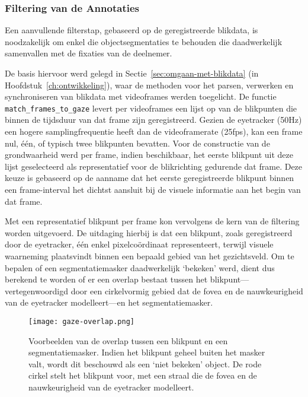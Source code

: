 \subsubsection{Filtering van de Annotaties}

Een aanvullende filterstap, gebaseerd op de geregistreerde blikdata, is noodzakelijk om enkel die objectsegmentaties 
te behouden die daadwerkelijk samenvallen met de fixaties van de deelnemer.

De basis hiervoor werd gelegd in Sectie~\ref{sec:omgaan-met-blikdata} (in Hoofdstuk~\ref{ch:ontwikkeling}), 
waar de methoden voor het parsen, verwerken en synchroniseren van blikdata met videoframes werden toegelicht. 
De functie \texttt{match\_frames\_to\_gaze} levert per videoframes een lijst op van de blikpunten die binnen de tijdsduur 
van dat frame zijn geregistreerd. 
Gezien de eyetracker (50Hz) een hogere samplingfrequentie heeft dan de videoframerate (25fps), 
kan een frame nul, één, of typisch twee blikpunten bevatten. 
Voor de constructie van de grondwaarheid werd per frame, indien beschikbaar, het eerste blikpunt uit deze lijst geselecteerd 
als representatief voor de blikrichting gedurende dat frame. 
Deze keuze is gebaseerd op de aanname dat het eerste geregistreerde blikpunt binnen een frame-interval 
het dichtst aansluit bij de visuele informatie aan het begin van dat frame.

Met een representatief blikpunt per frame kon vervolgens de kern van de filtering worden uitgevoerd. 
De uitdaging hierbij is dat een blikpunt, zoals geregistreerd door de eyetracker, één enkel pixelcoördinaat representeert, 
terwijl visuele waarneming plaatsvindt binnen een bepaald gebied van het gezichtsveld. 
Om te bepalen of een segmentatiemasker daadwerkelijk `bekeken' werd, dient dus berekend te worden of er een 
overlap bestaat tussen het blikpunt---vertegenwoordigd door een cirkelvormig gebied dat de fovea en de nauwkeurigheid van de eyetracker modelleert---en het segmentatiemasker.

\begin{figure}[H]
  \centering
  \texttt{[image: gaze-overlap.png]}
  \caption[]{\label{fig:gaze-overlap} 
    Voorbeelden van de overlap tussen een blikpunt en een segmentatiemasker.
    Indien het blikpunt geheel buiten het masker valt, wordt dit beschouwd als een `niet bekeken' object.
    De rode cirkel stelt het blikpunt voor, met een straal die de fovea en de nauwkeurigheid van de eyetracker modelleert.
  }
\end{figure}

